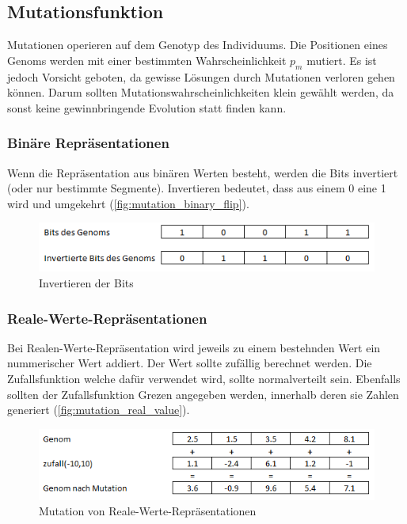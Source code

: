     \subsection{Mutationsfunktion}

      Mutationen operieren auf dem Genotyp des Individuums.
      Die Positionen eines Genoms werden mit einer bestimmten Wahrscheinlichkeit \(p_{m}\) mutiert.
      Es ist jedoch Vorsicht geboten, da gewisse Lösungen durch Mutationen verloren gehen können.
      Darum sollten Mutationswahrscheinlichkeiten klein gewählt werden, da sonst keine gewinnbringende Evolution statt finden kann.

      \subsubsection{Binäre Repräsentationen}

        Wenn die Repräsentation aus binären Werten besteht, werden die Bits invertiert (oder nur bestimmte Segmente).
        Invertieren bedeutet, dass aus einem 0 eine 1 wird und umgekehrt (\vref{fig:mutation_binary_flip}).

        \begin{figure}[H]
          \includegraphics[scale=1, center]{graphics/mutation_binary_flip}
          \caption{Invertieren der Bits\label{fig:mutation_binary_flip}}
        \end{figure}

      \subsubsection{Reale-Werte-Repräsentationen}

        Bei Realen-Werte-Repräsentation wird jeweils zu einem bestehnden Wert ein nummerischer Wert addiert.
        Der Wert sollte zufällig berechnet werden. Die Zufallsfunktion welche dafür verwendet wird, sollte normalverteilt sein.
        Ebenfalls sollten der Zufallsfunktion Grezen angegeben werden, innerhalb deren sie Zahlen generiert (\vref{fig:mutation_real_value}).

        \begin{figure}[H]
          \includegraphics[scale=1, center]{graphics/mutation_real_value}
          \caption{Mutation von Reale-Werte-Repräsentationen\label{fig:mutation_real_value}}
        \end{figure}

